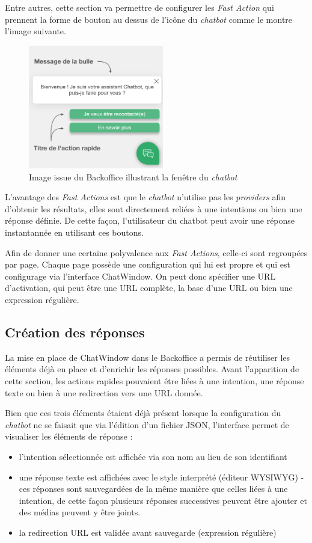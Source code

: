 \documentclass[12pt,a4paper,oneside]{scrreprt}
\begin{document}
Entre autres, cette section va permettre de configurer les \textit{Fast Action} qui prennent la forme de bouton au dessus de l'icône du \textit{chatbot} comme le montre l'image suivante.

\begin{figure}[!ht]
	\centering
	\includegraphics[width=5.9cm]{pictures/fa.png}
	\caption{Image issue du Backoffice illustrant la fenêtre du \textit{chatbot}}
\end{figure}

L'avantage des \textit{Fast Actions} est que le \textit{chatbot} n'utilise pas les \textit{providers} afin d'obtenir les résultats, elles sont directement reliées à une intentions ou bien une réponse définie. De cette façon, l'utilisateur du chatbot peut avoir une réponse instantannée en utilisant ces boutons.

Afin de donner une certaine polyvalence aux \textit{Fast Actions}, celle-ci sont regroupées par page. Chaque page possède une configuration qui lui est propre et qui est configurage via l'interface ChatWindow. On peut donc spécifier une URL d'activation, qui peut être une URL complète, la base d'une URL ou bien une expression régulière.

\subsection*{Création des réponses}

La mise en place de ChatWindow dans le Backoffice a permis de réutiliser les éléments déjà en place et d'enrichir les réponses possibles. Avant l'apparition de cette section, les actions rapides pouvaient être liées à une intention, une réponse texte ou bien à une redirection vers une URL donnée.

Bien que ces trois éléments étaient déjà présent lorsque la configuration du \textit{chatbot} ne se faisait que via l'édition d'un fichier JSON, l'interface permet de visualiser les éléments de réponse :
\begin{itemize}
	\item l'intention sélectionnée est affichée via son nom au lieu de son identifiant
	\item une réponse texte est affichées avec le style interprété (éditeur WYSIWYG)
	\subitem - ces réponses sont sauvegardées de la même manière que celles liées à une intention, de cette façon plusieurs réponses successives peuvent être ajouter et des médias peuvent y être joints.
	\item la redirection URL est validée avant sauvegarde (expression régulière)
\end{itemize}
\end{document}
